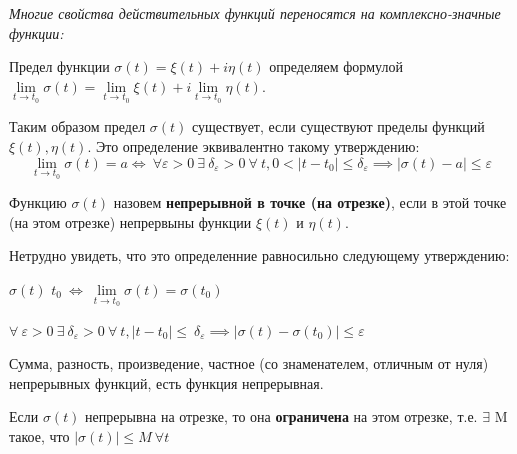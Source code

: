 \documentclass[a4paper, 12pt]{report}
\begin{document}
\par\bigskip
\textit{Многие свойства действительных функций переносятся на комплексно-значные функции:}
\par\bigskip
Предел функции $\sigma (t)  = \xi(t) + i\eta(t)$ определяем формулой $\lim\limits_{t \to t_0} \sigma (t) = \lim\limits_{t \to t_0} \xi (t) + i\lim\limits_{t \to t_0} \eta (t).$
\par\bigskip Таким образом предел $\sigma(t)$ существует, если существуют пределы функций $\xi (t), \eta (t)$.
Это определение эквивалентно такому  утверждению:
\begin {equation}
\lim\limits_{t \to t_0} \sigma(t) = a \iff \ \forall \varepsilon  > 0 \ \exists \  \delta_\varepsilon > 0 \ \forall \  t, 0 < |t - t_0| \leq \delta_\varepsilon \implies |\sigma (t) - a| \leq \varepsilon
\end{equation}

Функцию $\sigma (t)$ назовем \textbf{непрерывной в точке (на отрезке)}, если в этой точке (на этом отрезке) непрервыны функции $\xi (t)$ и $ \eta(t)$.
\par\bigskip Нетрудно увидеть, что это определенние равносильно следующему утверждению:
\par $\sigma(t)$  $t_0\ \iff \ \lim\limits_{t \to t_0} \sigma (t) = \sigma(t_0)$
\par
$\forall \ \varepsilon > 0 \ \exists \ \delta_\varepsilon > 0 \ \forall \ t, |t - t_0| \leq \ \delta_\varepsilon \implies |\sigma(t) - \sigma(t_0)| \leq \varepsilon$
\par\bigskip
Сумма, разность, произведение, частное (со знаменателем, отличным от нуля) непрерывных функций, есть функция непрерывная.

\par\bigskip
Если $\sigma(t)$ непрерывна на отрезке, то она \textbf{ограничена} на этом отрезке, т.е. $\exists$ M такое, что $|\sigma (t)| \leq M \ \forall t$
\end{document}

